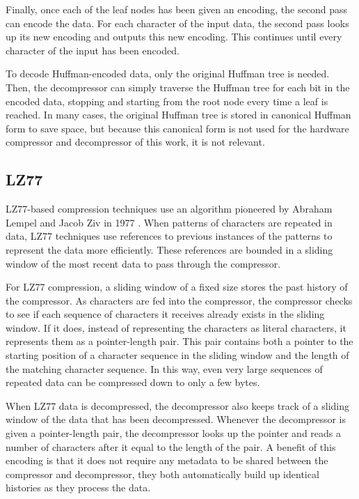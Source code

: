\documentclass[doublespace,draft,nopageskip]{VTthesis} %
\begin{document}
Finally, once each of the leaf nodes has been given an encoding, the second pass can encode the data. For each character of the input data, the second pass looks up its new encoding and outputs this new encoding. This continues until every character of the input has been encoded.

To decode Huffman-encoded data, only the original Huffman tree is needed. Then, the decompressor can simply traverse the Huffman tree for each bit in the encoded data, stopping and starting from the root node every time a leaf is reached. In many cases, the original Huffman tree is stored in canonical Huffman form to save space, but because this canonical form is not used for the hardware compressor and decompressor of this work, it is not relevant.

\subsection{LZ77}\label{ss:lz77}
LZ77-based compression techniques use an algorithm pioneered by Abraham Lempel and Jacob Ziv in 1977 \cite{lz77}. When patterns of characters are repeated in data, LZ77 techniques use references to previous instances of the patterns to represent the data more efficiently. These references are bounded in a sliding window of the most recent data to pass through the compressor.

For LZ77 compression, a sliding window of a fixed size stores the past history of the compressor. As characters are fed into the compressor, the compressor checks to see if each sequence of characters it receives already exists in the sliding window. If it does, instead of representing the characters as literal characters, it represents them as a pointer-length pair. This pair contains both a pointer to the starting position of a character sequence in the sliding window and the length of the matching character sequence. In this way, even very large sequences of repeated data can be compressed down to only a few bytes.

When LZ77 data is decompressed, the decompressor also keeps track of a sliding window of the data that has been decompressed. Whenever the decompressor is given a pointer-length pair, the decompressor looks up the pointer and reads a number of characters after it equal to the length of the pair. A benefit of this encoding is that it does not require any metadata to be shared between the compressor and decompressor, they both automatically build up identical histories as they process the data.
\end{document}
